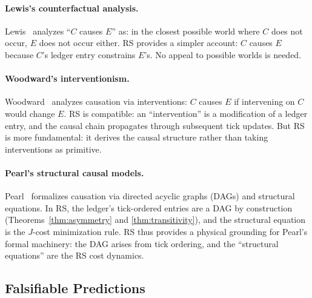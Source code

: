 \documentclass[12pt,a4paper]{article}
\theoremstyle{definition}
\theoremstyle{remark}
\begin{document}
\paragraph{Lewis's counterfactual analysis.}
Lewis~\cite{Lewis1973} analyzes ``$C$ causes $E$'' as: in the closest
possible world where $C$ does not occur, $E$ does not occur either.
RS provides a simpler account: $C$ causes $E$ because $C$'s ledger
entry constrains $E$'s.  No appeal to possible worlds is needed.

\paragraph{Woodward's interventionism.}
Woodward~\cite{Woodward2003} analyzes causation via interventions: $C$
causes $E$ if intervening on $C$ would change $E$.  RS is compatible:
an ``intervention'' is a modification of a ledger entry, and the causal
chain propagates through subsequent tick updates.  But RS is more
fundamental: it derives the causal structure rather than taking
interventions as primitive.

\paragraph{Pearl's structural causal models.}
Pearl~\cite{Pearl2000} formalizes causation via directed acyclic graphs
(DAGs) and structural equations.  In RS, the ledger's tick-ordered
entries are a DAG by construction (Theorems~\ref{thm:asymmetry} and
\ref{thm:transitivity}), and the structural equation is the $J$-cost
minimization rule.  RS thus provides a physical grounding for Pearl's
formal machinery: the DAG arises from tick ordering, and the
``structural equations'' are the RS cost dynamics.

\subsection{Falsifiable Predictions}
\end{document}
